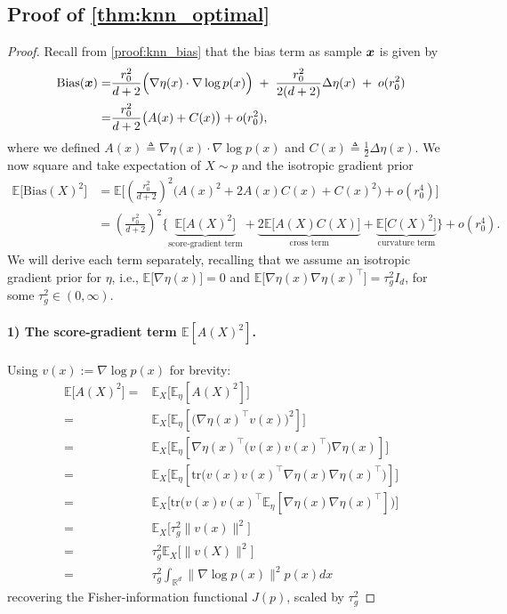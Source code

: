\subsection{Proof of \cref{thm:knn_optimal}}
\label{proof:knn_optimal}
\begin{proof}

Recall from \cref{proof:knn_bias} that the bias term as sample ${\bm{x}}$ is given by
\begin{align*}
\mathrm{Bias}({\bm{x}})
=&\frac{r_0^2}{d+2}\Big(\nabla\eta(x)\cdot\nabla\log p(x)\Big)\;+\;\frac{r_0^2}{2(d+2)}\Delta\eta(x)\;+\;o(r_0^2)\\
=&\frac{r_0^2}{d+2}\big(A(x)+C(x)\big)+o(r_0^2),
\end{align*}
where we defined $A(x)\triangleq \nabla\eta(x)\cdot\nabla\log p(x)$ and $ 
C(x)\triangleq\frac{1}{2}\Delta\eta(x)$.
We now square and take expectation of $X\sim p$ and the isotropic gradient prior 
\begin{align}
\mathbb{E}\big[\mathrm{Bias}(X)^2\big]
&=\mathbb{E}\big[\left(\frac{r_0^2}{d+2}\right)^2\big(A(x)^2 + 2A(x)C(x) + C(x)^2\big)
+ o(r_0^4)\big]\\
&=\left(\frac{r_0^2}{d+2}\right)^2
\Big\{\underbrace{\mathbb{E}\big[A(X)^2\big]}_{\text{score-gradient term}}
+ \underbrace{2\mathbb{E}\big[A(X)C(X)\big]}_{\text{cross term}}
+ \underbrace{\mathbb{E}\big[C(X)^2\big]}_{\text{curvature term}}\Big\}
+ o(r_0^4).
\label{eq:three-terms}
\end{align}
We will derive each term separately, recalling that we assume an isotropic gradient prior for $\eta$, i.e., $\mathbb{E}\big[\nabla\eta(x)\big]=0$ and $\mathbb{E}\big[\nabla\eta(x)\nabla\eta(x)^\top\big]=\tau_g^2I_d$,
for some $\tau_g^2\in(0,\infty)$.


\paragraph{1) The score-gradient term $\mathbb{E}[A(X)^2]$.}

Using $v(x):=\nabla\log p(x)$ for brevity:
\begin{align*}
\mathbb{E}\big[A(X)^2\big]
=&\mathbb{E}_X\big[\mathbb{E}_\eta[A(X)^2]\big]\\
=&\mathbb{E}_X\big[\mathbb{E}_\eta[\big(\nabla\eta(x)^\top v(x)\big)^2]\big]\\
=&\mathbb{E}_X\big[\mathbb{E}_\eta[\nabla\eta(x)^\top\Big(v(x)v(x)^\top\Big)\nabla\eta(x)]\big]\\
=&\mathbb{E}_X\big[\mathbb{E}_\eta[\mathrm{tr}\Big(v(x)v(x)^\top\nabla\eta(x)\nabla\eta(x)^\top\Big)]\big]\\
=&\mathbb{E}_X\big[\mathrm{tr}\Big(v(x)v(x)^\top\mathbb{E}_\eta[\nabla\eta(x)\nabla\eta(x)^\top]\Big)\big]\\=&\mathbb{E}_X\big[\tau_g^2\|v(x)\|^2\big]\\
=&\tau_g^2\mathbb{E}_X\big[\|v(X)\|^2\big]\\
=&\tau_g^2\int_{\mathbb{R}^d} \|\nabla\log p(x)\|^2p(x)dx
\end{align*}
recovering the Fisher-information functional $J(p)$, scaled by $\tau_g^2$



\end{proof}
